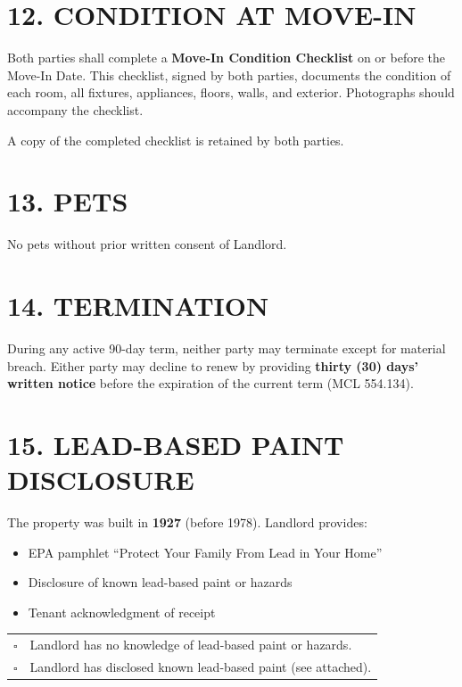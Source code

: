 \documentclass[11pt]{article}
\begin{document}
\section{12. CONDITION AT MOVE-IN}

Both parties shall complete a \textbf{Move-In Condition Checklist} on or
before the Move-In Date. This checklist, signed by both parties,
documents the condition of each room, all fixtures, appliances, floors,
walls, and exterior. Photographs should accompany the checklist.

A copy of the completed checklist is retained by both parties.

\section{13. PETS}

No pets without prior written consent of Landlord.

\section{14. TERMINATION}

During any active 90-day term, neither party may terminate except for
material breach. Either party may decline to renew by providing
\textbf{thirty (30) days' written notice} before the expiration of the
current term (MCL 554.134).

\section{15. LEAD-BASED PAINT DISCLOSURE}

The property was built in \textbf{1927} (before 1978). Landlord provides:

\begin{itemize}[nosep]
\item EPA pamphlet ``Protect Your Family From Lead in Your Home''
\item Disclosure of known lead-based paint or hazards
\item Tenant acknowledgment of receipt
\end{itemize}

\medskip
\begin{tabular}{@{}p{0.5cm}p{12cm}@{}}
$\square$ & Landlord has no knowledge of lead-based paint or hazards. \\
$\square$ & Landlord has disclosed known lead-based paint (see attached). \\
\end{tabular}
\end{document}
